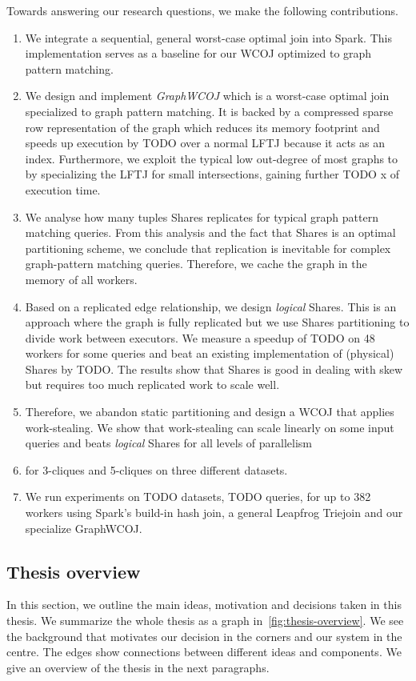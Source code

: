 Towards answering our research questions, we make the following contributions.
\begin{enumerate}
    \item We integrate a sequential, general worst-case optimal join into Spark.
    This implementation serves as a baseline for our \textsc{WCOJ} optimized to graph pattern matching.
    \item We design and implement \textit{GraphWCOJ} which is a worst-case optimal join specialized to graph pattern matching.
    It is backed by a compressed sparse row representation of the graph which reduces its memory footprint and speeds up execution by TODO over a normal \textsc{LFTJ} because it acts as an index. %
    Furthermore, we exploit the typical low out-degree of most graphs to by specializing the \textsc{LFTJ} for small intersections,
    gaining further TODO x of execution time. %
    \item We analyse how many tuples Shares replicates for typical graph pattern matching queries.
    From this analysis and the fact that Shares is an optimal partitioning scheme, we conclude that replication is inevitable for complex
    graph-pattern matching queries.
    Therefore, we cache the graph in the memory of all workers.
    \item Based on a replicated edge relationship, we design \textit{logical} Shares.
    This is an approach where the graph is fully replicated but we use Shares partitioning to divide work between executors.
    We measure a speedup of TODO on 48 workers for some queries and beat an existing implementation of (physical) Shares by TODO.
    The results show that Shares is good in dealing with skew but requires too much replicated work to scale well.
    \item Therefore, we abandon static partitioning and design a \textsc{WCOJ} that applies work-stealing.
    We show that work-stealing can scale linearly on some input queries and beats \textit{logical} Shares for all levels of parallelism
    \item for 3-cliques and 5-cliques on three different datasets.
    \item We run experiments on TODO datasets, TODO queries, for up to 382 workers using Spark's build-in hash join,
    a general Leapfrog Triejoin and our specialize GraphWCOJ.
\end{enumerate}

\subsection{Thesis overview} \label{subsec:thesis-idea}
In this section, we outline the main ideas, motivation and decisions taken in this thesis.
We summarize the whole thesis as a graph in~\cref{fig:thesis-overview}.
We see the background that motivates our decision in the corners and our system in the centre.
The edges show connections between different ideas and components.
We give an overview of the thesis in the next paragraphs.

